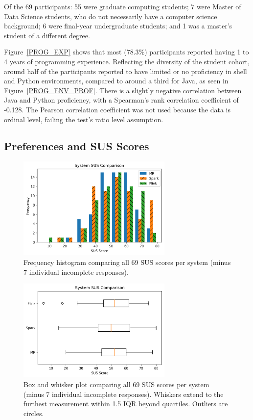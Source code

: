   Of the 69 participants: 55 were graduate computing students; 7 were Master of Data Science students, who do not necessarily have a computer science background; 6 were final-year undergraduate students; and 1 was a master's student of a different degree.

  Figure~\ref{PROG_EXP} shows that most (78.3\%) participants reported having 1 to 4 years of programming experience. Reflecting the diversity of the student cohort, around half of the participants reported to have limited or no proficiency in shell and Python environments, compared to around a third for Java, as seen in Figure~\ref{PROG_ENV_PROF}. There is a slightly negative correlation between Java and Python proficiency, with a Spearman's rank correlation coefficient of -0.128. The Pearson correlation coefficient was not used because the data is ordinal level, failing the test's ratio level assumption.


\subsection{Preferences and SUS Scores}
\label{PREF_SUS_SCORES}
  
  \begin{figure}[ht]
    \centering
    \includegraphics[width=3in]{./figs/system-sus-comparison-histogram.png}
    \caption{Frequency histogram comparing all 69 SUS scores per system (minus 7 individual incomplete responses).}
    \label{SYSTEM_SUS_HIST}
  \end{figure}
  
  \begin{figure}[ht]
    \centering
    \includegraphics[width=3in]{./figs/system-sus-comparison-boxplot.png}
    \caption{Box and whisker plot comparing all 69 SUS scores per system (minus 7 individual incomplete responses). Whiskers extend to the furthest measurement within 1.5 IQR beyond quartiles. Outliers are circles.}
    \label{SYSTEM_SUS_BOX}
  \end{figure}

